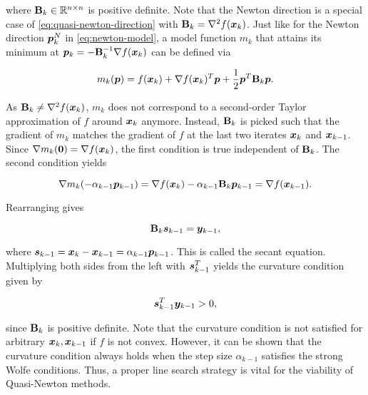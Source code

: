 \noindent where $\mathbf{B}_k \in \mathbb{R}^{n \times n}$ is positive definite. Note that the Newton direction is a special 
case of 
\autoref{eq:quasi-newton-direction} with $\mathbf{B}_k = \nabla^2 f(\bm{x}_k)$. Just like for the Newton direction $\bm{p}^N_k$ in
\autoref{eq:newton-model}, a model function $m_k$ 
that attains its minimum at $\bm{p}_k  = -\mathbf{B}^{-1}_k \nabla f(\bm{x}_k)$ can be defined via

\begin{equation}\label{eq:quasi-newton-model}
    m_k(\bm{p}) = f(\bm{x}_k)  + \nabla f(\bm{x}_k)^T \bm{p} + \frac{1}{2} \bm{p}^T\mathbf{B}_k\bm{p}.
\end{equation}

\noindent As $\mathbf{B}_k \neq \nabla^2 f(\bm{x}_k)$, $m_k$ does not correspond to a second-order Taylor approximation of $f$ around 
$\bm{x}_k$ anymore. Instead, $\mathbf{B}_k$ is picked such that the gradient of $m_k$ matches the gradient of $f$ at the last two iterates 
$\bm{x}_k$ and $\bm{x}_{k-1}$.
Since $\nabla m_{k}(\bm{0}) = \nabla f(\bm{x}_k)$, the first condition is true independent of $\mathbf{B}_k$. The 
second condition yields

\[
    \nabla m_{k}(-\alpha_{k-1}\bm{p}_{k-1}) = \nabla f(\bm{x}_k) - \alpha_{k-1}\mathbf{B}_{k}\bm{p}_{k-1} = \nabla f(\bm{x}_{k-1}).
\]

\noindent Rearranging gives

\begin{equation}\label{eq:secant-equation}
    \mathbf{B}_k \bm{s}_{k-1} = \bm{y}_{k-1},
\end{equation}

\noindent where $\bm{s}_{k-1} = \bm{x}_k - \bm{x}_{k-1} = \alpha_{k-1}\bm{p}_{k-1}$. This is called the secant equation. 
Multiplying both sides from the left with $\bm{s}_{k-1}^T$ yields the curvature condition given by

\begin{equation}\label{eq:curvature-condition}
    \bm{s}_{k-1}^T \bm{y}_{k-1} > 0,
\end{equation}

\noindent since $\mathbf{B}_k$ is positive definite. Note that the curvature condition is not satisfied for arbitrary $\bm{x}_k, \bm{x}_{k-1}$ 
if $f$ is 
not convex. However, it can be shown that the curvature condition always holds when the step size $\alpha_{k-1}$ satisfies the strong Wolfe 
conditions. Thus, a proper line search strategy is vital for the viability of Quasi-Newton methods.


